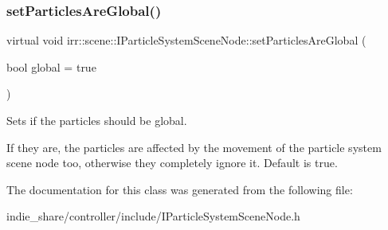\subsubsection{\texorpdfstring{set\+Particles\+Are\+Global()}{setParticlesAreGlobal()}\hspace{0.1cm}{\footnotesize\ttfamily [2/2]}}
{\footnotesize\ttfamily virtual void irr\+::scene\+::\+I\+Particle\+System\+Scene\+Node\+::set\+Particles\+Are\+Global (\begin{DoxyParamCaption}\item[{bool}]{global = {\ttfamily true} }\end{DoxyParamCaption})\hspace{0.3cm}{\ttfamily [pure virtual]}}



Sets if the particles should be global. 

If they are, the particles are affected by the movement of the particle system scene node too, otherwise they completely ignore it. Default is true. 

The documentation for this class was generated from the following file\+:\begin{DoxyCompactItemize}
\item 
indie\+\_\+share/controller/include/I\+Particle\+System\+Scene\+Node.\+h\end{DoxyCompactItemize}
